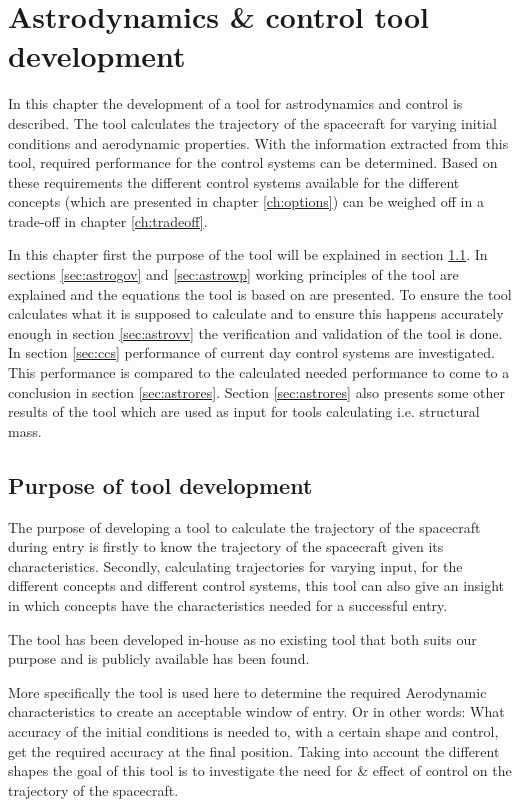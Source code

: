 \section{Astrodynamics \& control tool development}
\label{ch:astrocontrol}
In this chapter the development of a tool for astrodynamics and control is described. The tool calculates the trajectory of the spacecraft for varying initial conditions and aerodynamic properties. With the information extracted from this tool, required performance for the control systems can be determined. Based on these requirements the different control systems available for the different concepts (which are presented in chapter \ref{ch:options}) can be weighed off in a trade-off in chapter \ref{ch:tradeoff}.

In this chapter first the purpose of the tool will be explained in section \ref{sec:astropurpose}. In sections \ref{sec:astrogov} and \ref{sec:astrowp} working principles of the tool are explained and the equations the tool is based on are presented. To ensure the tool calculates what it is supposed to calculate and to ensure this happens accurately enough in section \ref{sec:astrovv} the verification and validation of the tool is done. In section \ref{sec:ccs} performance of current day control systems are investigated. This performance is compared to the calculated needed performance to come to a conclusion in section \ref{sec:astrores}. Section \ref{sec:astrores} also presents some other results of the tool which are used as input for tools calculating i.e. structural mass.

\subsection{Purpose of tool development}
\label{sec:astropurpose}
The purpose of developing a tool to calculate the trajectory of the spacecraft during entry is firstly to know the trajectory of the spacecraft given its characteristics. Secondly, calculating trajectories for varying input, for the different concepts and different control systems, this tool can also give an insight in which concepts have the characteristics needed for a successful entry.

The tool has been developed in-house as no existing tool that both suits our purpose and is publicly available has been found.

More specifically the tool is used here to determine the required Aerodynamic characteristics to create an acceptable window of entry. Or in other words: What accuracy of the initial conditions is needed to, with a certain shape and control, get the required accuracy at the final position. Taking into account the different shapes the goal of this tool is to investigate the need for \& effect of control on the trajectory of the spacecraft.

